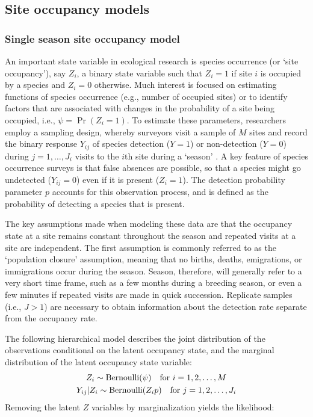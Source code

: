 \documentclass[article,shortnames]{jss}
\DeclareMathOperator{\Bern}{Bernoulli}
\begin{document}
\subsection{Site occupancy models}

\subsubsection{Single season site occupancy model} 
\label{sec:occ}
 
An important state variable in ecological research is species occurrence 
(or `site occupancy'), say $Z_{i}$, a binary state variable such that 
$Z_{i}=1$ if site $i$ is occupied by a species and $Z_{i}=0$ otherwise.
Much interest is focused on estimating functions of species occurrence 
(e.g., number of occupied sites) or to identify factors that are
associated with changes in the probability of a site being
occupied, i.e., $\psi  = \Pr(Z_{i}=1)$. To estimate these parameters, 
researchers employ a sampling design, whereby surveyors visit a sample of $M$
sites and record the binary response $Y_{ij}$ of species detection ($Y=1$) or
non-detection ($Y=0$) during $j=1,\ldots,J_{i}$ visits to the $i$th site 
during a `season' \citep{MacKenzie2002}.  
A key feature of species occurrence surveys is that false absences are 
possible, so that a species might go undetected ($Y_{ij} =0$) even if it is 
present ($Z_{i} = 1$). The detection probability parameter $p$ accounts for this 
observation process, and is defined as the
probability of detecting a species that is present. 

The key assumptions made when modeling these data are that the occupancy 
state at a site remains constant throughout the season and repeated visits at
a site are independent.  The first assumption is commonly referred to as the
`population closure' assumption, meaning that no births, deaths, emigrations,
or immigrations occur during the season.  
Season, therefore, will generally refer to a very short time frame, such as 
a few months during a breeding season, or even a few minutes if repeated 
visits are made in quick succession.  Replicate samples (i.e., $J>1$) are 
necessary to obtain information about the detection rate separate from 
the occupancy rate.  

The following hierarchical model describes the joint distribution of the 
observations conditional on the latent occupancy state, and the marginal 
distribution of the latent occupancy state variable:
\begin{gather}
Z_i \sim \Bern(\psi) \text{\quad for $i=1,2,\dots,M$} \notag \\
Y_{ij}|Z_i \sim \Bern(Z_i p)\text{\quad for $j=1,2,\dots,J_{i}$} \notag
\end{gather}
Removing the latent $Z$ variables by marginalization yields the likelihood:
\end{document}
